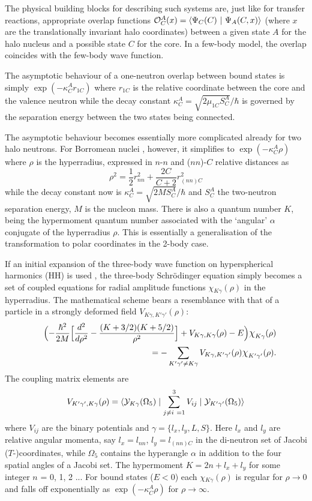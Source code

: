 The physical building blocks for describing such systems are, just
like for transfer reactions, appropriate overlap functions ${\cal
O}^A_C(x) = \langle \Psi_C(C) ~|~ \Psi_A(C,x) \rangle$ (where $x$
are the translationally invariant halo coordinates) between a
given state $A$ for the halo nucleus and a possible state $C$ for
the core. In a few-body model,
the overlap coincides with the few-body wave function.

The asymptotic behaviour of a one-neutron overlap between bound
states is simply $\exp(-\kappa^A_C r_{1C})$ where $r_{1C}$ is the
relative coordinate between the core and the valence neutron while
the decay constant  $\kappa^A_C = \sqrt{2\mu_{1C}S^A_C}/\hbar$ is
governed by the separation energy  between the two states being
connected.

The asymptotic behaviour becomes essentially more complicated
already for two halo neutrons. For Borromean nuclei \cite{zhuk},
however, it simplifies to  $\exp(-\kappa^A_C \rho)$ where $\rho$
is the hyperradius, expressed in $n$-$n$ and ($nn$)-$C$ relative
distances as
$$
\rho^2 = \frac{1}{2} r^2_{nn} + \frac{2C}{C+2} r^2_{(nn)C}
$$
while the decay constant now is $\kappa^A_C =
\sqrt{2MS^A_C}/\hbar$ and $S^A_C$   the two-neutron separation
energy, $M$ is the nucleon mass. There is also a quantum number
$K$, being the hypermoment quantum number associated with the
`angular'  $\alpha$ conjugate of the hyperradius $\rho$. This is
essentially a generalisation of the transformation to polar
coordinates in the 2-body case.

If an initial expansion of the three-body wave function on
hyperspherical harmonics (HH) is used \cite{zhuk}, the three-body
Schr\"{o}dinger equation simply becomes a set of coupled equations
for radial amplitude functions {\Large$\chi$}$_{K\gamma}(\rho)$ in
the hyperradius. The mathematical scheme bears a resemblance with
that of a particle in a strongly deformed field
$V_{K\gamma,K'\gamma'}(\rho)$:
\begin{eqnarray}
& &\Bigl( - \frac{\hbar^2}{2M} \Bigl[ \frac{d^2}{d\rho^2} -
\frac{(K+3/2)(K +5/2)}{\rho^2} \Bigr] + V_{K\gamma,K\gamma}(\rho)
- E
\Bigr) \mbox{\large $\chi$}_{K\gamma}(\rho)  \nonumber \\
& &~~~=   - \sum_{K'\gamma' \not= K\gamma} V_{K\gamma,
K'\gamma'}(\rho) \mbox{\large $\chi$}_{K'\gamma'}(\rho).
\label{hcc}
\end{eqnarray}
The coupling matrix elements are
\begin{equation}
V_{K'\gamma', K\gamma}(\rho) = \langle{\cal Y}_{K\gamma}(\Omega_5)
\mid \sum_{j\not=i\ =1}^{3} V_{ij}\mid {\cal Y}_{K'\gamma'}
(\Omega_5) \rangle
\end{equation}
where $V_{ij}$ are the binary potentials and $\gamma = \{ l_x,
l_y, L, S \}$. Here $l_x$  and $l_y$ are relative angular momenta,
say $l_x=l_{nn}$, $l_y=l_{(nn)C}$ in the di-neutron set of Jacobi
($T$-)coordinates, while $\Omega_5$ contains the hyperangle
$\alpha$ in addition to the four spatial angles of a Jacobi set.
The hypermoment  $K=2n+l_x+l_y$ for some integer $n$ = 0, 1, 2 ...
For bound states ($E<0$) each {\Large$\chi$}$_{K\gamma}(\rho)$ is
regular for $\rho \rightarrow 0$ and falls off exponentially as
$\exp(-\kappa_C^A \rho)$ for  $\rho \rightarrow \infty$.

